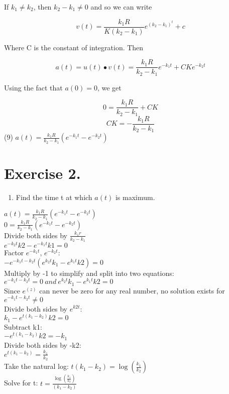 \documentclass[]{article}
\providecommand{\tightlist}{%
  \setlength{\itemsep}{0pt}\setlength{\parskip}{0pt}}
\begin{document}
If \(k_1 \neq k_2\), then \(k_2 - k _1 \neq 0\) and so we can write

\[v(t) = \frac{k_1R}{K(k_2 - k_1)}e^(k_2 -k_1)^t +c\]

Where C is the constant of integration. Then

\[a(t) = u(t) \bullet v(t) = \frac{k_1R}{k_2-k_1}e^{-k_1t} + CKe^{-k_2t}\]

Using the fact that \(a(0) = 0\), we get

\[0 = \frac{k_1R}{k_2-k_1} + CK\] \[CK = -\frac{k_1R}{k_2-k_1}\] (9)
\(a(t) = \frac{k_1R}{k_2-k_1}(e^{-k_1t} - e^{-k_2t})\)

\section{Exercise 2.}\label{exercise-2.}

\begin{enumerate}
\def\labelenumi{(\alph{enumi})}
\tightlist
\item
  Find the time t at which \(a(t)\) is maximum.
\end{enumerate}

\(a(t) = \frac{k_1 R}{k_2 - k_1}(e^{-k_1 t}-e^{-k_2 t})\)\\
\(0 = \frac{k_1 R}{k_2 - k_1}(e^{-k_1 t}-e^{-k_2 t})\)\\
Divide both sides by \(\frac{k_1 r}{k_2 - k_1}\)\\
\(e^{-k_2 t}k2 - e^{-k_1 t}k1 = 0\)\\
Factor \(e^{-k_1 t}\), \(e^{-k_2 t}\):\\
\(-e^{-k_1 t - k_2 t}(e^{k_2 t}k_1 - e^{k_1 t}k2) = 0\)\\
Multiply by -1 to simplify and split into two equations:\\
\(e^{-k_1 t - k_2 t} = 0 ~and~e^{k_2 t}k_1 - e^{k_1 t}k2= 0\)\\
Since \(e^(z)\) can never be zero for any real number, no solution
exists for \(e^{-k_1 t - k_2 t} \neq 0\)\\
Divide both sides by \(e^{k2 t}\):\\
\(k_1 - e^{t (k_1 - k_2)}k2= 0\)\\
Subtract k1:\\
\(- e^{t (k_1 - k_2)}k2= -k_1\)\\
Divide both sides by -k2:\\
\(e^{t (k_1 - k_2)}= \frac{k_1}{k_2}\)\\
Take the natural log: \(t (k_1 - k_2)= \log{(\frac{k_1}{k_2})}\)\\
Solve for t: \(t = \frac{\log{(\frac{k_1}{k_2})}}{(k_1 - k_2)}\)
\end{document}
